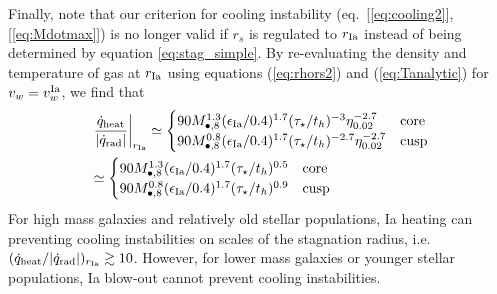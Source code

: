 \documentclass[usenatbib,fleqn]{mn2e}
\newcommand{\rs}{r_s}
\newcommand{\Mbheight}{M_{\bullet,8}}
\newcommand{\rIa}{r_{\rm Ia}}
\renewcommand{\th}{t_h}
\begin{document}
Finally, note that our criterion for cooling instability (eq.~[\ref{eq:cooling2}], [\ref{eq:Mdotmax}]) is no longer valid if $\rs$ is regulated to $\rIa$ instead of being determined by equation \eqref{eq:stag_simple}.  By re-evaluating the density and temperature of gas at $\rIa$ using equations  (\ref{eq:rhors2}) and (\ref{eq:Tanalytic}) for $v_w = v_{w}^{\rm Ia}$, we find that
\begin{align}
\label{eq:heatingratioIa}
&\left.\frac{\dot{q}_{\rm heat}}{\left|\dot{q}_{\rm rad}\right|}\right|_{\rIa}\simeq
\begin{cases}
  90 \Mbheight^{1.3} (\epsilon_{\rm Ia}/0.4)^{1.7} (\tau_{\star}/\th)^{-3}
  \eta_{0.02}^{-2.7} & \text{core}\nonumber\\
   90 \Mbheight^{0.8} (\epsilon_{\rm Ia}/0.4)^{1.7} (\tau_{\star}/\th)^{-2.7}
  \eta_{0.02}^{-2.7} & \text{cusp}\nonumber\\
\end{cases}\\&\simeq
\begin{cases}
  90 \Mbheight^{1.3} (\epsilon_{\rm Ia}/0.4)^{1.7}
  (\tau_{\star}/\th)^{0.5}
 & \text{core}\\
   90 \Mbheight^{0.8} (\epsilon_{\rm Ia}/0.4)^{1.7} (\tau_{\star}/\th)^{0.9}
  & \text{cusp}\\
\end{cases}
\end{align}
For high mass galaxies and relatively old stellar populations, Ia heating can preventing cooling instabilities on scales of the stagnation radius, i.e. $(\dot{q}_{\rm heat}/|\dot{q}_{\rm rad}|)_{\rIa} \gtrsim 10$.  However, for lower mass galaxies or younger stellar populations, Ia blow-out cannot prevent cooling instabilities.


\end{document}
